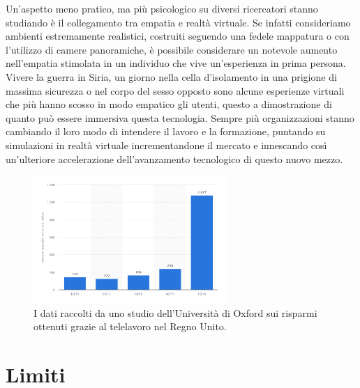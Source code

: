 Un'aspetto meno pratico, ma più psicologico su diversi ricercatori stanno studiando è il  collegamento tra empatia e realtà virtuale. Se infatti consideriamo ambienti estremamente realistici, costruiti seguendo una fedele mappatura o con l'utilizzo di camere panoramiche, è possibile considerare un notevole aumento nell'empatia stimolata in un individuo che vive un'esperienza in prima persona. Vivere la guerra in Siria, un giorno  nella cella d'isolamento in una prigione di massima sicurezza o nel corpo del sesso opposto sono alcune esperienze virtuali che più hanno scosso in modo empatico gli utenti,
questo a dimostrazione di quanto può essere immersiva questa tecnologia.
Sempre più organizzazioni stanno cambiando il loro modo di intendere il lavoro e la formazione, puntando su simulazioni in realtà virtuale incrementandone il mercato e innescando così un'ulteriore accelerazione dell'avanzamento tecnologico di questo nuovo mezzo. 
\begin{figure}[H]
	\includegraphics[width=0.65\textwidth]{figure/investimenti}
	\centering
	\caption{I dati raccolti da uno studio dell'Università di Oxford sui risparmi ottenuti grazie al telelavoro nel Regno Unito.}
\end{figure}

\section{Limiti}

